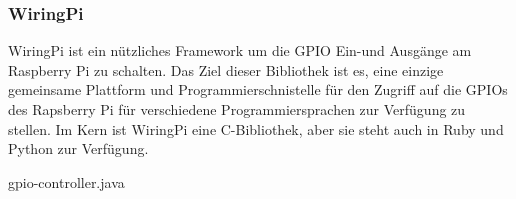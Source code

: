 \subsubsection{WiringPi}
WiringPi ist ein nützliches Framework um die GPIO Ein-und Ausgänge am Raspberry Pi zu schalten. Das Ziel dieser Bibliothek ist es, eine einzige gemeinsame Plattform und Programmierschnistelle für den Zugriff auf die GPIOs des Rapsberry Pi für verschiedene Programmiersprachen zur Verfügung zu stellen. Im Kern ist WiringPi eine C-Bibliothek, aber sie steht auch in Ruby und Python zur Verfügung.

\begin{code}
	\caption{gpio-controller.java}
	\label{src:gpio-controller}
\end{code}